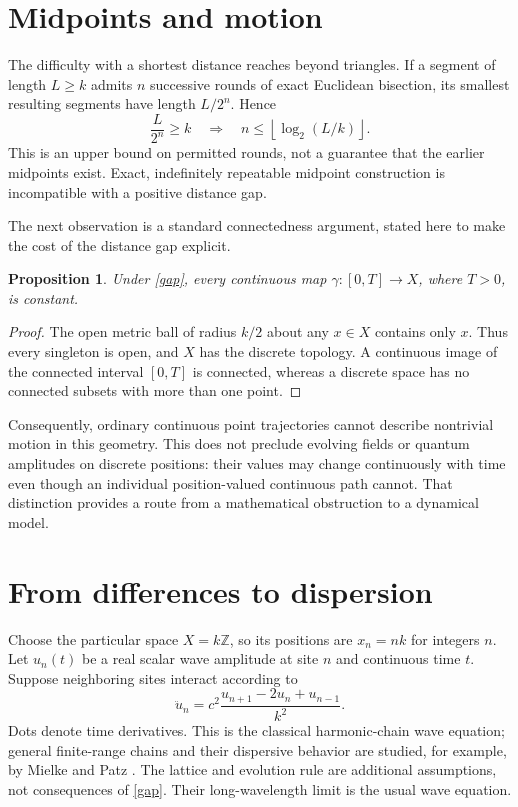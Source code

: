 \documentclass[11pt]{article}
\newtheorem{proposition}{Proposition}
\begin{document}
\section{Midpoints and motion}
The difficulty with a shortest distance reaches beyond triangles. If a segment of length $L\geq k$ admits $n$ successive rounds of exact Euclidean bisection, its smallest resulting segments have length $L/2^n$. Hence
\begin{equation}\label{bisection}
\frac{L}{2^n}\geq k
\quad\Longrightarrow\quad
n\leq\left\lfloor\log_2(L/k)\right\rfloor.
\end{equation}
This is an upper bound on permitted rounds, not a guarantee that the earlier midpoints exist. Exact, indefinitely repeatable midpoint construction is incompatible with a positive distance gap.

The next observation is a standard connectedness argument, stated here to make the cost of the distance gap explicit.
\begin{proposition}\label{motion}
Under \eqref{gap}, every continuous map $\gamma:[0,T]\to X$, where $T>0$, is constant.
\end{proposition}
\begin{proof}
The open metric ball of radius $k/2$ about any $x\in X$ contains only $x$. Thus every singleton is open, and $X$ has the discrete topology. A continuous image of the connected interval $[0,T]$ is connected, whereas a discrete space has no connected subsets with more than one point.
\end{proof}
Consequently, ordinary continuous point trajectories cannot describe nontrivial motion in this geometry. This does not preclude evolving fields or quantum amplitudes on discrete positions: their values may change continuously with time even though an individual position-valued continuous path cannot. That distinction provides a route from a mathematical obstruction to a dynamical model.

\section{From differences to dispersion}
Choose the particular space $X=k\mathbb Z$, so its positions are $x_n=nk$ for integers $n$. Let $u_n(t)$ be a real scalar wave amplitude at site $n$ and continuous time $t$. Suppose neighboring sites interact according to
\begin{equation}\label{wave}
\ddot u_n=c^2\frac{u_{n+1}-2u_n+u_{n-1}}{k^2}.
\end{equation}
Dots denote time derivatives. This is the classical harmonic-chain wave equation; general finite-range chains and their dispersive behavior are studied, for example, by Mielke and Patz \cite{mielke}. The lattice and evolution rule are additional assumptions, not consequences of \eqref{gap}. Their long-wavelength limit is the usual wave equation.
\end{document}
